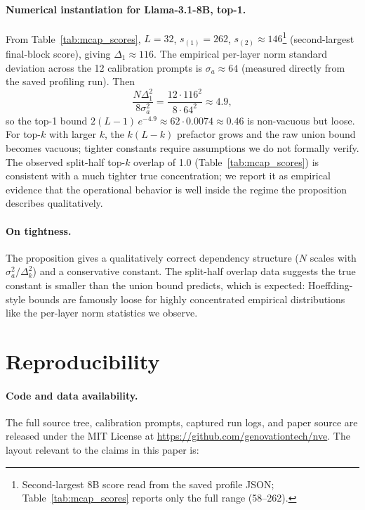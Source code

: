 \documentclass{article}
\begin{document}
\paragraph{Numerical instantiation for Llama-3.1-8B, top-1.} From
Table~\ref{tab:mcap_scores}, $L = 32$, $s_{(1)} = 262$, $s_{(2)} \approx 146$\footnote{%
Second-largest 8B score read from the saved profile JSON; Table~\ref{tab:mcap_scores}
reports only the full range (58--262).}
(second-largest final-block score), giving $\Delta_1 \approx 116$. The empirical
per-layer norm standard deviation across the 12 calibration prompts is
$\sigma_a \approx 64$ (measured directly from the saved profiling run). Then
\[
  \frac{N \Delta_1^2}{8 \sigma_a^2} = \frac{12 \cdot 116^2}{8 \cdot 64^2} \approx 4.9,
\]
so the top-1 bound $2(L-1)\,e^{-4.9} \approx 62 \cdot 0.0074 \approx 0.46$ is non-vacuous
but loose. For top-$k$ with larger $k$, the $k(L-k)$ prefactor grows and the raw union
bound becomes vacuous; tighter constants require assumptions we do not formally verify.
The observed split-half top-$k$ overlap of 1.0 (Table~\ref{tab:mcap_scores}) is
consistent with a much tighter true concentration; we report it as empirical evidence
that the operational behavior is well inside the regime the proposition describes
qualitatively.

\paragraph{On tightness.} The proposition gives a qualitatively correct dependency
structure ($N$ scales with $\sigma_a^2 / \Delta_k^2$) and a conservative constant. The
split-half overlap data suggests the true constant is smaller than the union bound
predicts, which is expected: Hoeffding-style bounds are famously loose for highly
concentrated empirical distributions like the per-layer norm statistics we observe.


\section{Reproducibility}
\label{app:reproducibility}

\paragraph{Code and data availability.}
The full source tree, calibration prompts, captured run logs, and paper
source are released under the MIT License at
\url{https://github.com/genovationtech/nve}. The layout relevant to the
claims in this paper is:
\end{document}
